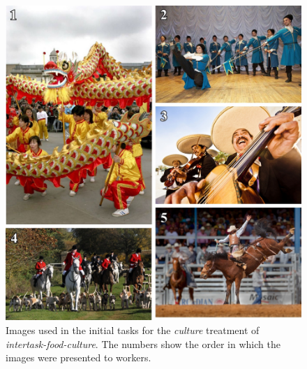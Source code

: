 \documentclass{sigchi}
\begin{document}
\begin{figure}
	\begin{center}
	\includegraphics{figs/task2-cult.jpg}
	\end{center}
	\caption{
		Images used in the initial tasks for the
		\textit{culture} treatment of \textit{intertask-food-culture}.  
		The numbers show the order in which the 
		images were presented to workers.
	}
	\label{fig:task2:cult}
\end{figure}
\end{document}
